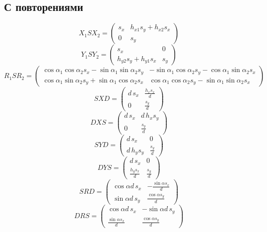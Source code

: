 \subsection{С повторениями}
\[X_1SX_2 = \begin{pmatrix}{s_x} & {h_{x1}} {s_y}+{h_{x2}} {s_x}\\
0 & {s_y}\end{pmatrix}\]
\[Y_1SY_2 = \begin{pmatrix}{s_x} & 0\\
{h_{y2}} {s_y}+{h_{y1}} {s_x} & {s_y}\end{pmatrix}\]
\[R_1SR_2 = \begin{pmatrix}\cos{\alpha_1 } \cos{\alpha_2 } {s_x}-\sin{\alpha_1 } \sin{\alpha_2 } {s_y} & -\sin{\alpha_1 } \cos{\alpha_2 } {s_y}-\cos{\alpha_1 } \sin{\alpha_2 } {s_x}\\
\cos{\alpha_1 } \sin{\alpha_2 } {s_y}+\sin{\alpha_1 } \cos{\alpha_2 } {s_x} & \cos{\alpha_1 } \cos{\alpha_2 } {s_y}-\sin{\alpha_1 } \sin{\alpha_2 } {s_x}\end{pmatrix}\]
\[SXD = \begin{pmatrix}d\, {s_x} & \frac{{h_x} {s_x}}{d}\\
0 & \frac{{s_y}}{d}\end{pmatrix}\]
\[DXS = \begin{pmatrix}d\, {s_x} & d\, {h_x} {s_y}\\
0 & \frac{{s_y}}{d}\end{pmatrix}\]
\[SYD = \begin{pmatrix}d\, {s_x} & 0\\
d\, {h_y} {s_y} & \frac{{s_y}}{d}\end{pmatrix}\]
\[DYS = \begin{pmatrix}d\, {s_x} & 0\\
\frac{{h_y} {s_x}}{d} & \frac{{s_y}}{d}\end{pmatrix}\]
\[SRD = \begin{pmatrix}\cos\alpha d\, {s_x} & -\frac{\sin\alpha {s_x}}{d}\\
\sin\alpha d\, {s_y} & \frac{\cos\alpha {s_y}}{d}\end{pmatrix}\]
\[DRS = \begin{pmatrix}\cos\alpha d\, {s_x} & -\sin\alpha d\, {s_y}\\
\frac{\sin\alpha {s_x}}{d} & \frac{\cos\alpha {s_y}}{d}\end{pmatrix}\]

